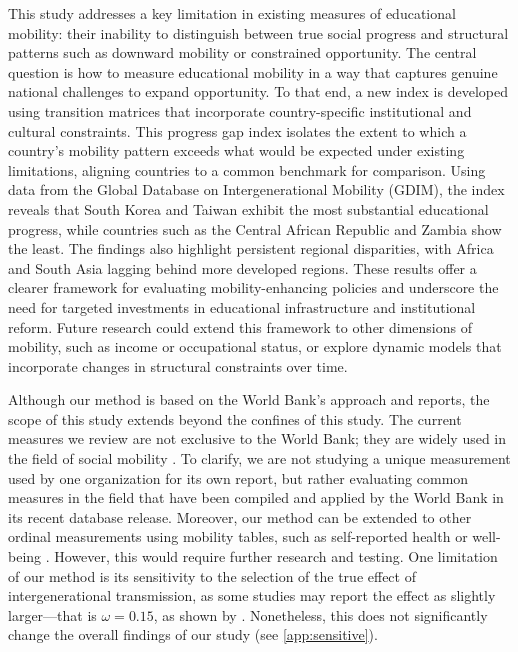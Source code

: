 This study addresses a key limitation in existing measures of educational mobility: their inability to distinguish between true social progress and structural patterns such as downward mobility or constrained opportunity. The central question is how to measure educational mobility in a way that captures genuine national challenges to expand opportunity. To that end, a new index is developed using transition matrices that incorporate country-specific institutional and cultural constraints. This progress gap index isolates the extent to which a country's mobility pattern exceeds what would be expected under existing limitations, aligning countries to a common benchmark for comparison. Using data from the Global Database on Intergenerational Mobility (GDIM), the index reveals that South Korea and Taiwan exhibit the most substantial educational progress, while countries such as the Central African Republic and Zambia show the least. The findings also highlight persistent regional disparities, with Africa and South Asia lagging behind more developed regions. These results offer a clearer framework for evaluating mobility-enhancing policies and underscore the need for targeted investments in educational infrastructure and institutional reform. Future research could extend this framework to other dimensions of mobility, such as income or occupational status, or explore dynamic models that incorporate changes in structural constraints over time.

Although our method is based on the World Bank's approach and reports, the scope of this study extends beyond the confines of this study. The current measures we review are not exclusive to the World Bank; they are widely used in the field of social mobility \citep{corak2020canadian, chetty2014land, asher2019getting, alesina2021intergenerational, chetty2017fading}. To clarify, we are not studying a unique measurement used by one organization for its own report, but rather evaluating common measures in the field that have been compiled and applied by the World Bank in its recent database release. Moreover, our method can be extended to other ordinal measurements using mobility tables, such as self-reported health \citep{halliday2021intergenerational} or well-being \citep{molina2011intergenerational}. However, this would require further research and testing. One limitation of our method is its sensitivity to the selection of the true effect of intergenerational transmission, as some studies may report the effect as slightly larger---that is $\omega=0.15$, as shown by \citet{fleury2018intergenerational}. Nonetheless, this does not significantly change the overall findings of our study (see \ref{app:sensitive}).


